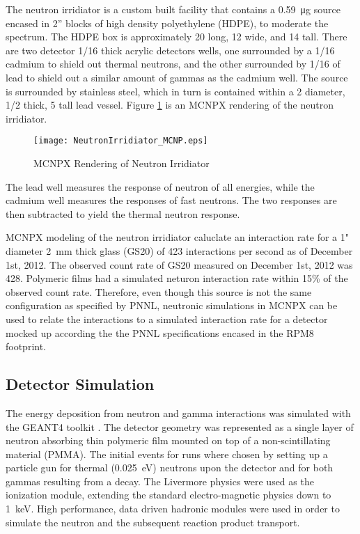\documentclass[draftcls,onecolumn]{IEEEtran}
\begin{document}
The neutron irridiator is a custom built facility that contains a \SI{0.59}{\ug}  source encased in 2” blocks of high density polyethylene (HDPE), to moderate the  spectrum.
The HDPE box is approximately \SI{20}{\in}  long, \SI{12}{\in} wide, and \SI{14}{\in} tall.
There are two detector \SI{1/16}{\in} thick acrylic detectors wells, one surrounded by a \SI{1/16}{\in} cadmium to shield out thermal neutrons, and the other surrounded by \SI{1/16}{\in} of lead to shield out a similar amount of gammas as the cadmium well.
The  source is surrounded by stainless steel, which in turn is contained within a \SI{2}{\in} diameter, \SI{1/2}{\in} thick, \SI{5}{\in} tall lead vessel. 
Figure \ref{fig:neutronIrridiator} is an MCNPX rendering of the neutron irridiator.
\begin{figure}[ht]
	\centering
	\texttt{[image: NeutronIrridiator\_MCNP.eps]}
	\caption{MCNPX Rendering of Neutron Irridiator}
	\label{fig:neutronIrridiator}
\end{figure}
The lead well measures the response of neutron of all energies, while the cadmium well measures the responses of fast neutrons.
The two responses are then subtracted to yield the thermal neutron response.

MCNPX modeling of the neutron irridiator caluclate an interaction rate for a 1" diameter \SI{2}{\mm} thick  glass (GS20) of 423 interactions per second as of December 1st, 2012.
The observed count rate of GS20 measured on December 1st, 2012 was \SI{428}{\cps}. 
Polymeric films had a simulated neturon interaction rate within 15\% of the observed count rate.
Therefore, even though this source is not the same configuration as specified by PNNL, neutronic simulations in MCNPX can be used to relate the interactions to a simulated interaction rate for a detector mocked up according the the PNNL specifications encased in the RPM8 footprint.

\subsection{Detector Simulation}
The energy deposition from neutron and gamma interactions was simulated with the GEANT4 toolkit \cite{agostinelli_geant4simulation_2003}.
The detector geometry was represented as a single layer of neutron absorbing thin polymeric film mounted on top of a non-scintillating material (PMMA).
The initial events for runs where chosen by setting up a particle gun for thermal (\SI{0.025}{\eV}) neutrons upon the detector and for both gammas resulting from a  decay.
The Livermore physics were used as the ionization module, extending the standard electro-magnetic physics down to \SI{1}{\kilo\eV}.
High performance, data driven hadronic modules were used in order to simulate the neutron and the subsequent reaction product transport.
\end{document}
